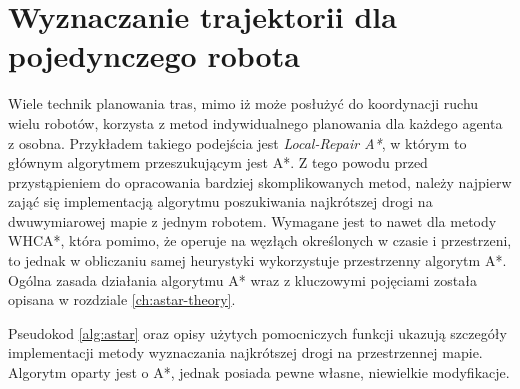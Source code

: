 \section{Wyznaczanie trajektorii dla pojedynczego robota}
\label{ch:alg-single-astar}

Wiele technik planowania tras, mimo iż może posłużyć do koordynacji ruchu wielu robotów, korzysta z metod indywidualnego planowania dla każdego agenta z osobna. Przykładem takiego podejścia jest {\it Local-Repair A*}, w którym to głównym algorytmem przeszukującym jest A*.
Z tego powodu przed przystąpieniem do opracowania bardziej skomplikowanych metod, należy najpierw zająć się implementacją algorytmu poszukiwania najkrótszej drogi na dwuwymiarowej mapie z jednym robotem. Wymagane jest to nawet dla metody WHCA*, która pomimo, że operuje na węzłąch określonych w czasie i przestrzeni, to jednak w obliczaniu samej heurystyki wykorzystuje przestrzenny algorytm A*.
Ogólna zasada działania algorytmu A* wraz z kluczowymi pojęciami została opisana w rozdziale \ref{ch:astar-theory}.

Pseudokod \ref{alg:astar} oraz opisy użytych pomocniczych funkcji ukazują szczegóły implementacji metody wyznaczania najkrótszej drogi na przestrzennej mapie. Algorytm oparty jest o A*, jednak posiada pewne własne, niewielkie modyfikacje.

